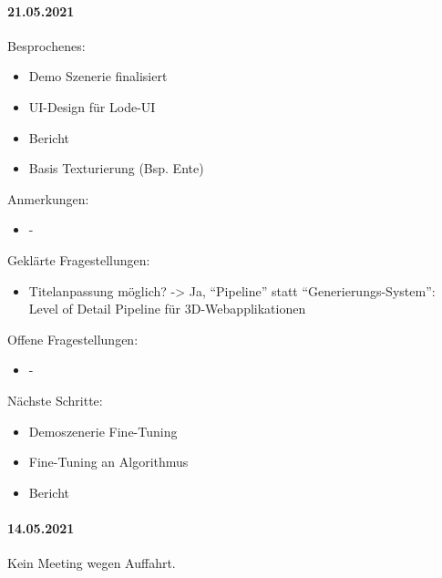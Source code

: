 \paragraph{21.05.2021}
Besprochenes:
\begin{itemize}
  \item Demo Szenerie finalisiert
  \item UI-Design für Lode-UI
  \item Bericht
  \item Basis Texturierung (Bsp. Ente)
\end{itemize}
Anmerkungen:
\begin{itemize}
  \item -
\end{itemize}
Geklärte Fragestellungen:
\begin{itemize}
  \item Titelanpassung möglich? -> Ja, “Pipeline” statt “Generierungs-System”: Level of Detail Pipeline für 3D-Webapplikationen
\end{itemize}
Offene Fragestellungen:
\begin{itemize}
  \item -
\end{itemize}
Nächste Schritte:
\begin{itemize}
  \item  Demoszenerie Fine-Tuning
  \item Fine-Tuning an Algorithmus
  \item Bericht
\end{itemize}

\newpage

\paragraph{14.05.2021}
Kein Meeting wegen Auffahrt.

